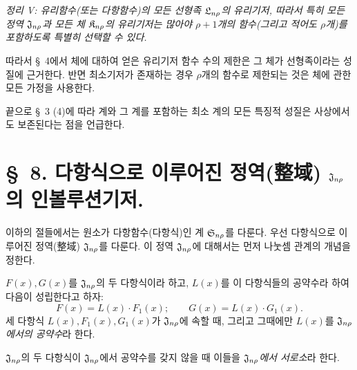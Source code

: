 \emph{정리 V: 유리함수(또는 다항함수)의 모든 선형족 $\mathfrak L_{n\rho}$의 유리기저, 따라서 특히 모든 정역 $\mathfrak J_{n\rho}$과 모든 체 $\mathfrak K_{n\rho}$의 유리기저는 많아야 $\rho+1$개의 함수(그리고 적어도 $\rho$개)를 포함하도록 특별히 선택할 수 있다.}

따라서 \S\ 4에서 체에 대하여 얻은 유리기저 함수 수의 제한은 그 체가 선형족이라는 성질에 근거한다. 반면 최소기저가 존재하는 경우 $\rho$개의 함수로 제한되는 것은 체에 관한 모든 가정을 사용한다.

끝으로 \S\ 3 (4)에 따라 계와 그 계를 포함하는 최소 계의 모든 특징적 성질은 사상에서도 보존된다는 점을 언급한다.

\section*{\S\ 8. 다항식으로 이루어진 정역(整域) $\mathfrak J_{n\rho}$의 인볼루션기저.}

이하의 절들에서는 원소가 다항함수(다항식)인 계 $\mathfrak S_{n\rho}$를 다룬다. 우선 다항식으로 이루어진 정역(整域) $\mathfrak J_{n\rho}$를 다룬다. 이 정역 $\mathfrak J_{n\rho}$에 대해서는 먼저 나눗셈 관계의 개념을 정한다.

$F(x),G(x)$를 $\mathfrak J_{n\rho}$의 두 다항식이라 하고, $L(x)$를 이 다항식들의 공약수라 하여 다음이 성립한다고 하자:
\[
F(x)=L(x)\cdot F_1(x);\qquad G(x)=L(x)\cdot G_1(x).
\]
세 다항식 $L(x),F_1(x),G_1(x)$가 $\mathfrak J_{n\rho}$에 속할 때, 그리고 그때에만 $L(x)$를 \emph{$\mathfrak J_{n\rho}$에서의 공약수}라 한다.

$\mathfrak J_{n\rho}$의 두 다항식이 $\mathfrak J_{n\rho}$에서 공약수를 갖지 않을 때 이들을 \emph{$\mathfrak J_{n\rho}$에서 서로소}라 한다.

